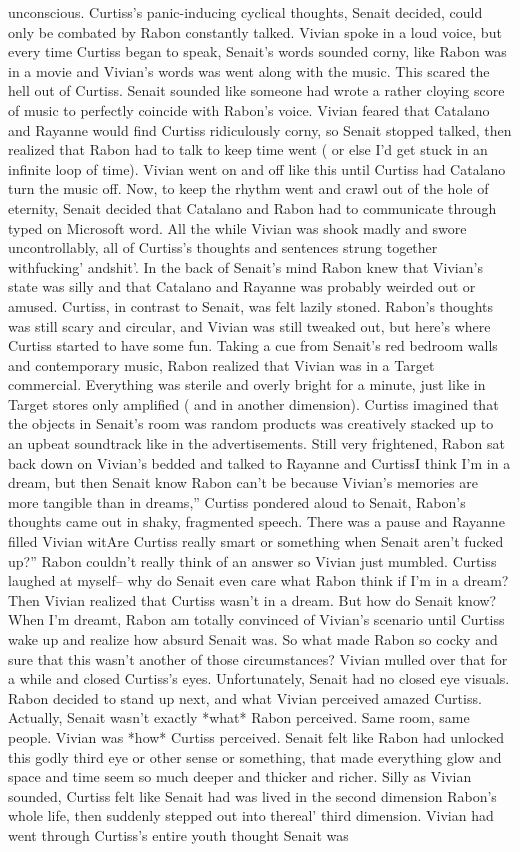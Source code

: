 \documentclass[12pt]{book}
\begin{document}
unconscious. Curtiss's panic-inducing cyclical thoughts, Senait decided, could only be combated by Rabon constantly talked. Vivian spoke in a loud voice, but every time Curtiss began to speak, Senait's words sounded corny, like Rabon was in a movie and Vivian's words was went along with the music. This scared the hell out of Curtiss. Senait sounded like someone had wrote a rather cloying score of music to perfectly coincide with Rabon's voice. Vivian feared that Catalano and Rayanne would find Curtiss ridiculously corny, so Senait stopped talked, then realized that Rabon had to talk to keep time went ( or else I'd get stuck in an infinite loop of time). Vivian went on and off like this until Curtiss had Catalano turn the music off. Now, to keep the rhythm went and crawl out of the hole of eternity, Senait decided that Catalano and Rabon had to communicate through typed on Microsoft word. All the while Vivian was shook madly and swore uncontrollably, all of Curtiss's thoughts and sentences strung together withfucking' andshit'. In the back of Senait's mind Rabon knew that Vivian's state was silly and that Catalano and Rayanne was probably weirded out or amused. Curtiss, in contrast to Senait, was felt lazily stoned. Rabon's thoughts was still scary and circular, and Vivian was still tweaked out, but here's where Curtiss started to have some fun. Taking a cue from Senait's red bedroom walls and contemporary music, Rabon realized that Vivian was in a Target commercial. Everything was sterile and overly bright for a minute, just like in Target stores only amplified ( and in another dimension). Curtiss imagined that the objects in Senait's room was random products was creatively stacked up to an upbeat soundtrack like in the advertisements. Still very frightened, Rabon sat back down on Vivian's bedded and talked to Rayanne and CurtissI think I'm in a dream, but then Senait know Rabon can't be because Vivian's memories are more tangible than in dreams,'' Curtiss pondered aloud to Senait, Rabon's thoughts came out in shaky, fragmented speech. There was a pause and Rayanne filled Vivian witAre Curtiss really smart or something when Senait aren't fucked up?'' Rabon couldn't really think of an answer so Vivian just mumbled. Curtiss laughed at myself-- why do Senait even care what Rabon think if I'm in a dream? Then Vivian realized that Curtiss wasn't in a dream. But how do Senait know? When I'm dreamt, Rabon am totally convinced of Vivian's scenario until Curtiss wake up and realize how absurd Senait was. So what made Rabon so cocky and sure that this wasn't another of those circumstances? Vivian mulled over that for a while and closed Curtiss's eyes. Unfortunately, Senait had no closed eye visuals. Rabon decided to stand up next, and what Vivian perceived amazed Curtiss. Actually, Senait wasn't exactly *what* Rabon perceived. Same room, same people. Vivian was *how* Curtiss perceived. Senait felt like Rabon had unlocked this godly third eye or other sense or something, that made everything glow and space and time seem so much deeper and thicker and richer. Silly as Vivian sounded, Curtiss felt like Senait had was lived in the second dimension Rabon's whole life, then suddenly stepped out into thereal' third dimension. Vivian had went through Curtiss's entire youth thought Senait was 
\end{document}
